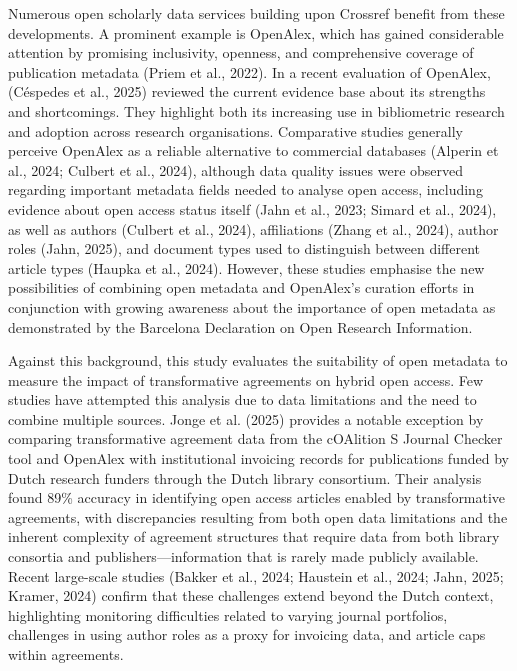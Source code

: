 \documentclass[a4paper,man,floatsintext,longtable,noextraspace,10pt]{apa6}
\begin{document}
Numerous open scholarly data services building upon Crossref benefit
from these developments. A prominent example is OpenAlex, which has
gained considerable attention by promising inclusivity, openness, and
comprehensive coverage of publication metadata (Priem et al., 2022). In
a recent evaluation of OpenAlex, (Céspedes et al., 2025) reviewed the
current evidence base about its strengths and shortcomings. They
highlight both its increasing use in bibliometric research and adoption
across research organisations. Comparative studies generally perceive
OpenAlex as a reliable alternative to commercial databases (Alperin et
al., 2024; Culbert et al., 2024), although data quality issues were
observed regarding important metadata fields needed to analyse open
access, including evidence about open access status itself (Jahn et al.,
2023; Simard et al., 2024), as well as authors (Culbert et al., 2024),
affiliations (Zhang et al., 2024), author roles (Jahn, 2025), and
document types used to distinguish between different article types
(Haupka et al., 2024). However, these studies emphasise the new
possibilities of combining open metadata and OpenAlex's curation efforts
in conjunction with growing awareness about the importance of open
metadata as demonstrated by the Barcelona Declaration on Open Research
Information.

Against this background, this study evaluates the suitability of open
metadata to measure the impact of transformative agreements on hybrid
open access. Few studies have attempted this analysis due to data
limitations and the need to combine multiple sources. Jonge et al.
(2025) provides a notable exception by comparing transformative
agreement data from the cOAlition S Journal Checker tool and OpenAlex
with institutional invoicing records for publications funded by Dutch
research funders through the Dutch library consortium. Their analysis
found 89\% accuracy in identifying open access articles enabled by
transformative agreements, with discrepancies resulting from both open
data limitations and the inherent complexity of agreement structures
that require data from both library consortia and
publishers---information that is rarely made publicly available. Recent
large-scale studies (Bakker et al., 2024; Haustein et al., 2024; Jahn,
2025; Kramer, 2024) confirm that these challenges extend beyond the
Dutch context, highlighting monitoring difficulties related to varying
journal portfolios, challenges in using author roles as a proxy for
invoicing data, and article caps within agreements.
\end{document}
